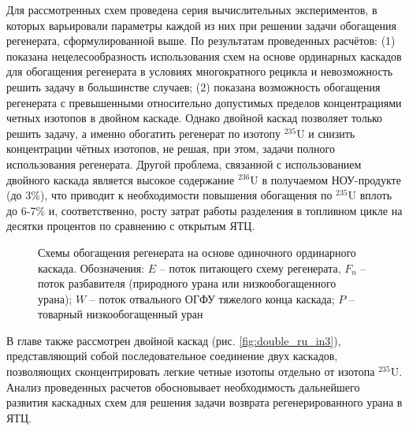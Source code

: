 Для рассмотренных схем проведена серия вычислительных экспериментов, в которых варьировали параметры каждой из них при решении задачи обогащения регенерата, сформулированной выше. По результатам проведенных расчётов: (1) показана нецелесообразность использования схем на основе ординарных каскадов для обогащения регенерата в условиях многократного рецикла и невозможность решить задачу в большинстве случаев; (2) показана возможность обогащения регенерата с превышенными относительно допустимых пределов концентрациями четных изотопов в двойном каскаде. Однако двойной каскад позволяет только решить задачу, а именно обогатить регенерат по изотопу $^{235}$U и снизить концентрации чётных изотопов, не решая, при этом, задачи полного использования регенерата. Другой проблема, связанной с использованием двойного каскада является высокое содержание $^{236}$U в получаемом НОУ-продукте (до 3\%), что приводит к необходимости повышения обогащения по $^{235}$U вплоть до 6-7\% и, соответственно, росту затрат работы разделения в топливном цикле на десятки процентов по сравнению с открытым ЯТЦ.

\begin{figure}[ht]
  \caption{Схемы обогащения регенерата на основе одиночного ординарного каскада. Обозначения: $E$ -- поток питающего схему регенерата, $F_n$ -- поток разбавителя (природного урана или низкообогащенного урана); $W$ -- поток отвального ОГФУ тяжелого конца каскада; $P$ -- товарный низкообогащенный уран}\label{fig:diagram1ch3}
\end{figure}

В главе также рассмотрен двойной каскад (рис. \ref{fig:double_ru_in3}), представляющий собой последовательное соединение двух каскадов, позволяющих сконцентрировать легкие четные изотопы отдельно от изотопа $^{235}$U. Анализ проведенных расчетов обосновывает необходимость дальнейшего развития каскадных схем для решения задачи возврата регенерированного урана в ЯТЦ.

